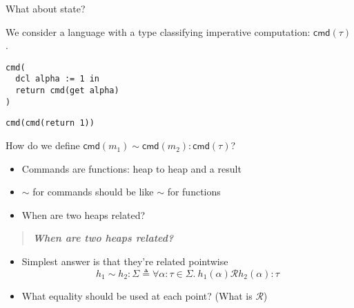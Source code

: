 \documentclass{beamer}
\newcommand{\relR}{\ensuremath{\mathrel{\mathcal{R}}}}
\newcommand{\defs}{\ensuremath{\mathrel{\triangleq}}}
\newcommand{\cmd}[1]{\ensuremath{\mathsf{cmd}(#1)}}
\begin{document}
\begin{frame}
  \centering
  What about state?

  \pause
  \bigskip

  We consider a language with a type classifying imperative
  computation: $\cmd{\tau}$.
\end{frame}

\begin{frame}[fragile]
  \centering
  \begin{minipage}{0.5\textwidth}
    \centering
\begin{lstlisting}
cmd(
  dcl alpha := 1 in
  return cmd(get alpha)
)
\end{lstlisting}
  \end{minipage}%
  \begin{minipage}{0.5\textwidth}
    \centering
\begin{lstlisting}
cmd(cmd(return 1))
\end{lstlisting}
  \end{minipage}
\end{frame}

\begin{frame}
  \centering
  How do we define $\cmd{m_1} \sim \cmd{m_2} : \cmd{\tau}$?
  \pause
  \bigskip
  \begin{itemize}
  \item Commands are functions: heap to heap and a result
  \item $\sim$ for commands should be like $\sim$ for functions
  \item When are two heaps related?
  \end{itemize}
\end{frame}

\begin{frame}
  \begin{quote}\centering
    \bf\it When are two heaps related?
  \end{quote}

  \begin{itemize}
  \item Simplest answer is that they're related pointwise\\
    \[
      h_1 \sim h_2 : \Sigma \defs
      \forall \alpha : \tau \in \Sigma.\ h_1(\alpha) \relR h_2(\alpha) : \tau
    \]
  \item What equality should be used at each point? (What is $\relR$)
  \end{itemize}
\end{frame}
\end{document}
